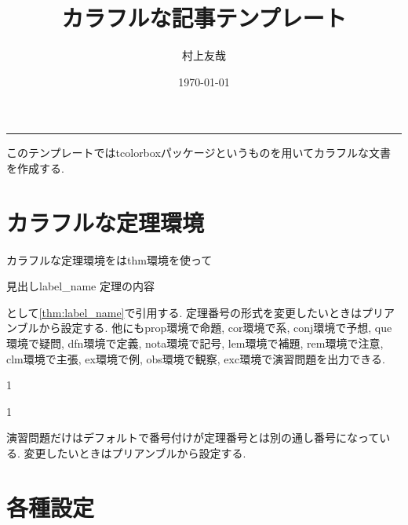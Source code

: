 \documentclass[11pt,a4paper,oneside,lualatex]{ltjsarticle} %
\makeatletter
\numberwithin{equation}{section} %
\renewcommand{\maketitle}{\begin{titlepage}%
		\let\footnotesize\small
		\let\footnoterule\relax
		\parindent \z@
		\reset@font
		\null\vfil
		\begin{center}
			\Huge \@title
		\end{center}
		\par
		\hrule height 4pt
		\par
		\vskip 40\p@
		\begin{flushright}
			\LARGE \@author \par
		\end{flushright}
		\vskip 30\p@
		\begin{flushright}
			{\large \@date}%
		\end{flushright}
		\vskip 30\p@		
		\begin{contentsbox}
			\makeatletter
			\@starttoc{toc}
			\makeatother
		\end{contentsbox}
	\end{titlepage}%
	\setcounter{footnote}{0}%
}
\makeatother
\begin{document}

\title{カラフルな記事テンプレート}
\author{村上友哉}
\date{\today}

\maketitle



このテンプレートではtcolorboxパッケージというものを用いてカラフルな文書を作成する.


\section{カラフルな定理環境} \label{sec:thm}


カラフルな定理環境をはthm環境を使って

\begin{thm}{見出し}{label_name}
	定理の内容
\end{thm}

として\cref{thm:label_name}で引用する.
定理番号の形式を変更したいときはプリアンブルから設定する.
他にもprop環境で命題, cor環境で系, conj環境で予想, que環境で疑問, dfn環境で定義, nota環境で記号, lem環境で補題, rem環境で注意, clm環境で主張, ex環境で例, obs環境で観察, exc環境で演習問題を出力できる.

\begin{dfn}{}{1}
	
\end{dfn}

\begin{lem}{}{1}
	
\end{lem}

\begin{exc}{}{}
	演習問題だけはデフォルトで番号付けが定理番号とは別の通し番号になっている.
	変更したいときはプリアンブルから設定する.
\end{exc}


\section{各種設定} \label{sec:setting}
\end{document}
